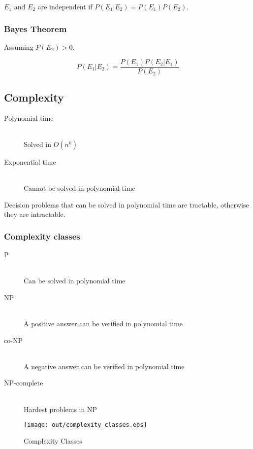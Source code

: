 \documentclass[a4paper]{article}
\begin{document}
$E_{1}$ and $E_{2}$ are independent if $P(E_{1} | E_{2}) = P(E_{1})P(E_{2})$.

\subsubsection{Bayes Theorem}

Assuming $P(E_{2}) > 0$.

\[
  P(E_{1} | E_{2}) = \frac{P(E_{1})P(E_{2} | E_{1})}
                          {P(E_{2})}
\]

\subsection{Complexity}

\begin{description}
  \item[Polynomial time] \hfill \\
    Solved in $O(n^{k})$
  \item[Exponential time] \hfill \\
    Cannot be solved in polynomial time
\end{description}

Decision problems that can be solved in polynomial time are tractable, otherwise
they are intractable.

\subsubsection{Complexity classes}

\begin{description}
  \item[P] \hfill \\
    Can be solved in polynomial time
  \item[NP] \hfill \\
    A positive answer can be verified in polynomial time
  \item[co-NP] \hfill \\
    A negative answer can be verified in polynomial time
  \item[NP-complete] \hfill \\
    Hardest problems in NP
\end{description}

\begin{figure}[h!]
  \centering
  \texttt{[image: out/complexity\_classes.eps]}
  \caption{Complexity Classes}
  \label{fig:complexity_classes}
\end{figure}
\FloatBarrier
\end{document}
